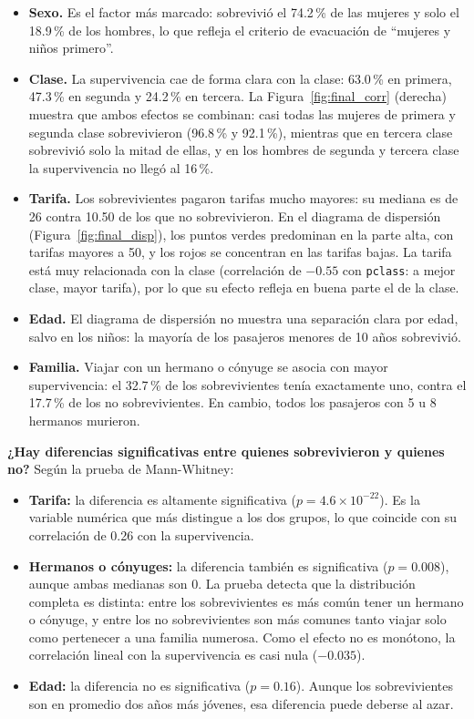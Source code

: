 \documentclass[11pt,letterpaper]{article}
\begin{document}
\begin{itemize}
    \item \textbf{Sexo.} Es el factor más marcado: sobrevivió el 74.2\,\% de las mujeres y solo el 18.9\,\% de los hombres, lo que refleja el criterio de evacuación de ``mujeres y niños primero''.
    \item \textbf{Clase.} La supervivencia cae de forma clara con la clase: 63.0\,\% en primera, 47.3\,\% en segunda y 24.2\,\% en tercera. La Figura~\ref{fig:final_corr} (derecha) muestra que ambos efectos se combinan: casi todas las mujeres de primera y segunda clase sobrevivieron (96.8\,\% y 92.1\,\%), mientras que en tercera clase sobrevivió solo la mitad de ellas, y en los hombres de segunda y tercera clase la supervivencia no llegó al 16\,\%.
    \item \textbf{Tarifa.} Los sobrevivientes pagaron tarifas mucho mayores: su mediana es de 26 contra 10.50 de los que no sobrevivieron. En el diagrama de dispersión (Figura~\ref{fig:final_disp}), los puntos verdes predominan en la parte alta, con tarifas mayores a 50, y los rojos se concentran en las tarifas bajas. La tarifa está muy relacionada con la clase (correlación de $-0.55$ con \texttt{pclass}: a mejor clase, mayor tarifa), por lo que su efecto refleja en buena parte el de la clase.
    \item \textbf{Edad.} El diagrama de dispersión no muestra una separación clara por edad, salvo en los niños: la mayoría de los pasajeros menores de 10 años sobrevivió.
    \item \textbf{Familia.} Viajar con un hermano o cónyuge se asocia con mayor supervivencia: el 32.7\,\% de los sobrevivientes tenía exactamente uno, contra el 17.7\,\% de los no sobrevivientes. En cambio, todos los pasajeros con 5 u 8 hermanos murieron.
\end{itemize}

\textbf{¿Hay diferencias significativas entre quienes sobrevivieron y quienes no?} Según la prueba de Mann-Whitney:

\begin{itemize}
    \item \textbf{Tarifa:} la diferencia es altamente significativa ($p = 4.6 \times 10^{-22}$). Es la variable numérica que más distingue a los dos grupos, lo que coincide con su correlación de 0.26 con la supervivencia.
    \item \textbf{Hermanos o cónyuges:} la diferencia también es significativa ($p = 0.008$), aunque ambas medianas son 0. La prueba detecta que la distribución completa es distinta: entre los sobrevivientes es más común tener un hermano o cónyuge, y entre los no sobrevivientes son más comunes tanto viajar solo como pertenecer a una familia numerosa. Como el efecto no es monótono, la correlación lineal con la supervivencia es casi nula ($-0.035$).
    \item \textbf{Edad:} la diferencia no es significativa ($p = 0.16$). Aunque los sobrevivientes son en promedio dos años más jóvenes, esa diferencia puede deberse al azar.
\end{itemize}
\end{document}
